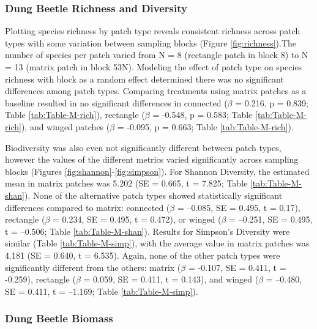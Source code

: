 \documentclass[
  man, donotrepeattitle]{apa6}
\begin{document}
\subsubsection{Dung Beetle Richness and Diversity}\label{dung-beetle-richness-and-diversity}

Plotting species richness by patch type reveals consistent richness across patch types with some variation between sampling blocks (Figure \ref{fig:richness}).The number of species per patch varied from N = 8 (rectangle patch in block 8) to N = 13 (matrix patch in block 53N). Modeling the effect of patch type on species richness with block as a random effect determined there was no significant differences among patch types. Comparing treatments using matrix patches as a baseline resulted in no significant differences in connected (\(\beta\) = 0.216, p = 0.839; Table \ref{tab:Table-M-rich}), rectangle (\(\beta\) = -0.548, p = 0.583; Table \ref{tab:Table-M-rich}), and winged patches (\(\beta\) = -0.095, p = 0.663; Table \ref{tab:Table-M-rich}).

Biodiversity was also even not significantly different between patch types, however the values of the different metrics varied significantly across sampling blocks (Figures \ref{fig:shannon}-\ref{fig:simpson}). For Shannon Diversity, the estimated mean in matrix patches was 5.202 (SE = 0.665, t = 7.825; Table \ref{tab:Table-M-shan}). None of the alternative patch types showed statistically significant differences compared to matrix: connected (\(\beta\) = --0.085, SE = 0.495, t = 0.17), rectangle (\(\beta\) = 0.234, SE = 0.495, t = 0.472), or winged (\(\beta\) = --0.251, SE = 0.495, t = --0.506; Table \ref{tab:Table-M-shan}). Results for Simpson's Diversity were similar (Table \ref{tab:Table-M-simp}), with the average value in matrix patches was 4.181 (SE = 0.640, t = 6.535). Again, none of the other patch types were significantly different from the others: matrix (\(\beta\) = -0.107, SE = 0.411, t = -0.259), rectangle (\(\beta\) = 0.059, SE = 0.411, t = 0.143), and winged (\(\beta\) = --0.480, SE = 0.411, t = --1.169; Table \ref{tab:Table-M-simp}).

\subsubsection{Dung Beetle Biomass}\label{dung-beetle-biomass}
\end{document}
